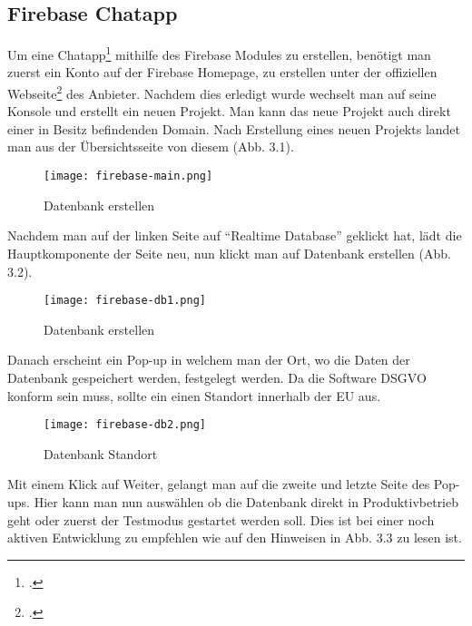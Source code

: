 \subsection{Firebase Chatapp}
Um eine Chatapp\footcite{Chatapp-Beispiel} mithilfe des Firebase Modules zu erstellen, benötigt man zuerst ein Konto auf der Firebase Homepage, zu erstellen unter der offiziellen Webseite\footcite{firebase-site} des Anbieter.
Nachdem dies erledigt wurde wechselt man auf seine Konsole und erstellt ein neuen Projekt. Man kann das neue Projekt auch direkt einer in Besitz befindenden Domain. Nach Erstellung eines neuen Projekts landet man aus der Übersichtsseite
von diesem (Abb. 3.1).

\begin{center}
    \begin{figure}[h]
        \centering
        \texttt{[image: firebase-main.png]}
        \caption{Datenbank erstellen}
    \end{figure}
\end{center}

Nachdem man auf der linken Seite auf "`Realtime Database"' geklickt hat, lädt die Hauptkomponente der Seite neu, nun klickt man auf Datenbank erstellen (Abb. 3.2).

\begin{center}
    \begin{figure}[h]
        \centering
        \texttt{[image: firebase-db1.png]}
        \caption{Datenbank erstellen}
    \end{figure}
\end{center}

Danach erscheint ein Pop-up in welchem man der Ort, wo die Daten der Datenbank gespeichert werden, festgelegt werden. Da die Software DSGVO konform sein muss, sollte ein einen Standort innerhalb der EU aus.

\begin{center}
    \begin{figure}[h]
        \centering
        \texttt{[image: firebase-db2.png]}
        \caption{Datenbank Standort}
    \end{figure}
\end{center}

Mit einem Klick auf Weiter, gelangt man auf die zweite und letzte Seite des Pop-ups. Hier kann man nun auswählen ob die Datenbank direkt in Produktivbetrieb geht oder zuerst der Testmodus gestartet werden soll. Dies ist bei einer
noch aktiven Entwicklung zu empfehlen wie auf den Hinweisen in Abb. 3.3 zu lesen ist.

